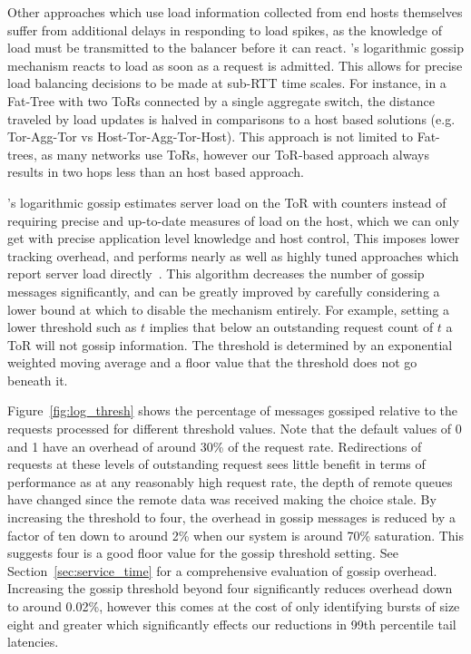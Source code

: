 Other approaches which use load information collected from end hosts
themselves suffer from additional delays in responding to load spikes,
as the knowledge of load must be transmitted to the balancer before it
can react. \daronpon's logarithmic gossip mechanism reacts to load as soon as a request is admitted. 
%
This allows for precise load balancing decisions to be made at sub-RTT time scales. 
For instance, in a Fat-Tree with two ToRs connected by a single
aggregate switch, the distance traveled by load updates is halved in
comparisons to a host based solutions (e.g. Tor-Agg-Tor vs
Host-Tor-Agg-Tor-Host). This approach is not limited to Fat-trees,
as many networks use ToRs, however our ToR-based approach always results
in two hops less than an host based approach.

\daronpon's logarithmic gossip estimates server load on the ToR with counters instead of  requiring precise and up-to-date measures of load on the host, which we can
only get with precise application level knowledge and host control, 
%
This imposes lower tracking overhead, and performs nearly as well as highly tuned approaches which report server load directly~\cite[Figure. 15 (proactive)]{racksched}.
This algorithm decreases the number of gossip messages
significantly, and can be greatly improved by carefully considering a
lower bound at which to disable the mechanism entirely.
For example, setting a lower threshold such as $t$ implies that below an outstanding request count of $t$ a ToR will not gossip information.
%
The threshold is determined by an exponential weighted moving average and a floor value that the threshold does not go beneath it.

Figure~\ref{fig:log_thresh} shows the percentage of messages gossiped relative
to the requests processed for different threshold values.  Note that the
default values of 0 and 1 have an overhead of around 30\% of the request rate.
Redirections of requests at these levels of outstanding request sees little
benefit in terms of performance as at any reasonably high request rate, the
depth of remote queues have changed since the remote data was received making
the choice stale. 
%
By increasing the threshold to four, the overhead in gossip
messages is reduced by a factor of ten down to around 2\% when our system is
around 70\% saturation. 
%
This suggests four is a good floor value for the gossip threshold setting.
%
See Section~\ref{sec:service_time} for a comprehensive
evaluation of gossip overhead. Increasing the gossip threshold beyond four
significantly reduces overhead down to around 0.02\%, however this comes at the
cost of only identifying bursts of size eight and greater which significantly
effects our reductions in 99th percentile tail latencies.

